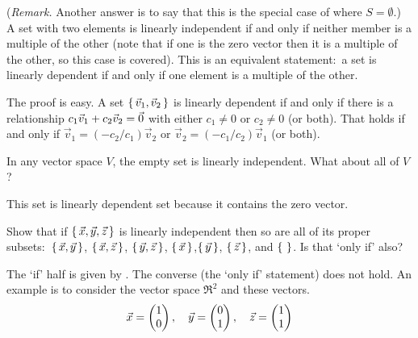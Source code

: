 \begin{exercises}
\begin{answer}
\begin{exparts}
          (\textit{Remark.} 
          Another answer is to say that this is the special case of
           where \( S=\emptyset \).)
        \partsitem A set with two elements is linearly independent 
          if and only if neither member is a  multiple of the other 
          (note that if one is the zero vector then it is a multiple of the
          other, so this case is covered).
          This is an equivalent statement:~a set is linearly dependent if and
          only if one element is a multiple of the other.

          The proof is easy.
          A set $\mbox{$\{\,\vec{v}_1,\vec{v}_2\,\}$}$ is linearly dependent if and only
          if there is a relationship $c_1\vec{v}_1+c_2\vec{v}_2=\vec{0}$ 
          with either $c_1\neq 0$ or $c_2\neq 0$ (or both).
          That holds if and only if $\vec{v}_1=(-c_2/c_1)\vec{v}_2$
          or $\vec{v}_2=(-c_1/c_2)\vec{v}_1$ (or both).
       \end{exparts}   
     \end{answer}
  \item  
    In any vector space \( V \), the empty set is linearly independent.
    What about all of \( V \)?
    \begin{answer}
      This set is linearly dependent set because it contains the zero vector.  
    \end{answer}
  \item 
    Show that if \( \mbox{$\{\,\vec{x},\vec{y},\vec{z}\,\}$} \) is linearly
    independent then so are all of its proper 
    subsets:~\( \mbox{$\{\,\vec{x},\vec{y}\,\}$} \),
    \( \mbox{$\{\,\vec{x},\vec{z}\,\}$} \), \( \mbox{$\{\,\vec{y},\vec{z}\,\}$} \),
    \( \mbox{$\{\,\vec{x}\,\}$} \),\( \mbox{$\{\,\vec{y}\,\}$} \), \( \mbox{$\{\,\vec{z}\,\}$} \),
    and \( \mbox{$\{\,\,\}$} \).
    Is that `only if' also?
    \begin{answer}
      The `if' half is given by .
      The converse (the `only if' statement) does not hold. 
      An example is to consider the vector space \( \Re^2 \) and
      these vectors.
      \begin{equation*}
         \vec{x}=\begin{pmatrix} 1 \\ 0 \end{pmatrix},\quad
         \vec{y}=\begin{pmatrix} 0 \\ 1 \end{pmatrix},\quad
         \vec{z}=\begin{pmatrix} 1 \\ 1 \end{pmatrix}
      \end{equation*} 
    \end{answer}
  \item 
    \begin{exparts}

\end{exparts}
\end{exercises}
